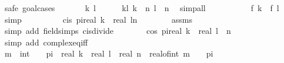 \begin{isabellebody}
\ {\isacharparenleft}{\kern0pt}safe{\isacharcomma}{\kern0pt}\ goal{\isacharunderscore}{\kern0pt}cases{\isacharparenright}{\kern0pt}\isanewline
\ \ \ \ \isamarkupfalse%
\ {\isacharparenleft}{\kern0pt}{}\ k\ l{\isacharparenright}{\kern0pt}\isanewline
\ \ \ \ \isamarkupfalse%
\ kl{\isacharcolon}{\kern0pt}\ {\isachardoublequoteopen}k\ {\isacharless}{\kern0pt}\ n{\isachardoublequoteclose}\ {\isachardoublequoteopen}l\ {\isacharless}{\kern0pt}\ n{\isachardoublequoteclose}\ \isamarkupfalse%
\ simp{\isacharunderscore}{\kern0pt}all\isanewline
\ \ \ \ \isamarkupfalse%
\ {}\ \isamarkupfalse%
\ {\isachardoublequoteopen}{}\ {\isacharequal}{\kern0pt}\ {\isacharquery}{\kern0pt}f\ k\ {\isacharslash}{\kern0pt}\ {\isacharquery}{\kern0pt}f\ l{\isachardoublequoteclose}\ \isamarkupfalse%
\ simp\isanewline
\ \ \ \ \isamarkupfalse%
\ \isamarkupfalse%
\ {\isachardoublequoteopen}{\isasymdots}\ {\isacharequal}{\kern0pt}\ cis\ {\isacharparenleft}{\kern0pt}{}{\isacharasterisk}{\kern0pt}pi{\isacharasterisk}{\kern0pt}{\isacharparenleft}{\kern0pt}real\ k\ {\isacharminus}{\kern0pt}\ real\ l{\isacharparenright}{\kern0pt}{\isacharslash}{\kern0pt}n{\isacharparenright}{\kern0pt}{\isachardoublequoteclose}\isanewline
\ \ \ \ \ \ \isamarkupfalse%
\ assms\ \isamarkupfalse%
\ {\isacharparenleft}{\kern0pt}simp\ add{\isacharcolon}{\kern0pt}\ field{\isacharunderscore}{\kern0pt}simps\ cis{\isacharunderscore}{\kern0pt}divide{\isacharparenright}{\kern0pt}\isanewline
\ \ \ \ \isamarkupfalse%
\ \isamarkupfalse%
\ {\isachardoublequoteopen}cos\ {\isacharparenleft}{\kern0pt}{}{\isacharasterisk}{\kern0pt}pi{\isacharasterisk}{\kern0pt}{\isacharparenleft}{\kern0pt}real\ k\ {\isacharminus}{\kern0pt}\ real\ l{\isacharparenright}{\kern0pt}\ {\isacharslash}{\kern0pt}\ n{\isacharparenright}{\kern0pt}\ {\isacharequal}{\kern0pt}\ {}{\isachardoublequoteclose}\isanewline
\ \ \ \ \ \ \isamarkupfalse%
\ {\isacharparenleft}{\kern0pt}simp\ add{\isacharcolon}{\kern0pt}\ complex{\isacharunderscore}{\kern0pt}eq{\isacharunderscore}{\kern0pt}iff{\isacharparenright}{\kern0pt}\isanewline
\ \ \ \ \isamarkupfalse%
\ \isamarkupfalse%
\ m\ {\isacharcolon}{\kern0pt}{\isacharcolon}{\kern0pt}\ int\ \ {\isachardoublequoteopen}{}\ {\isacharasterisk}{\kern0pt}\ pi\ {\isacharasterisk}{\kern0pt}\ {\isacharparenleft}{\kern0pt}real\ k\ {\isacharminus}{\kern0pt}\ real\ l{\isacharparenright}{\kern0pt}\ {\isacharslash}{\kern0pt}\ real\ n\ {\isacharequal}{\kern0pt}\ real{\isacharunderscore}{\kern0pt}of{\isacharunderscore}{\kern0pt}int\ m\ {\isacharasterisk}{\kern0pt}\ {}\ {\isacharasterisk}{\kern0pt}\ pi{\isachardoublequoteclose}\isanewline

\end{isabellebody}
